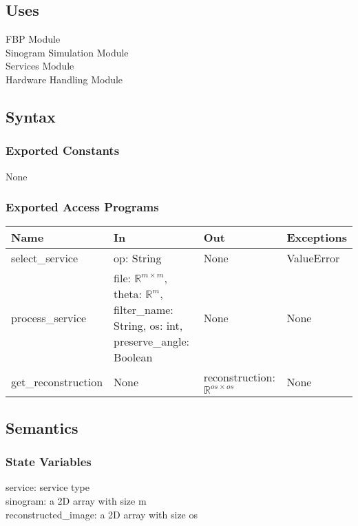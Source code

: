 \documentclass[12pt, titlepage]{article}
\begin{document}
\subsection{Uses}
FBP Module\\
Sinogram Simulation Module\\
Services Module\\
Hardware Handling Module\\

\subsection{Syntax}

\subsubsection{Exported Constants}
None

\subsubsection{Exported Access Programs}

\begin{center}
  \begin{tabular}{|l|m{10em}|l|m{8em}|}
  \hline
  \textbf{Name} & \textbf{In} & \textbf{Out} & \textbf{Exceptions} \\
  \hline
  select\_service & op: String & None & ValueError \\
  \hline
    process\_service & file: \(\mathbb{R}^{m \times m}\), theta: \(\mathbb{R}^{m}\), filter\_name: String, os: int, preserve\_angle: Boolean & None & None \\
  \hline
  get\_reconstruction & None & reconstruction: \(\mathbb{R}^{os \times os}\) & None \\
  \hline
\end{tabular}
\end{center}

\subsection{Semantics}

\subsubsection{State Variables}
service: service type\\
sinogram: a 2D array with size m\\
reconstructed\_image: a 2D array with size os\\
\end{document}
